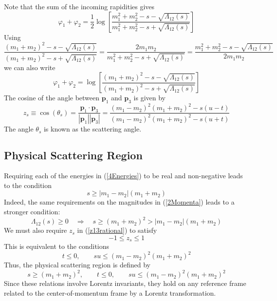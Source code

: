 Note that the sum of the incoming rapidities gives
\begin{equation}
	\varphi_{1} + \varphi_{2} = \frac{1}{2} \log{\left[ \frac{m_{1}^{2} + m_{2}^{2} - s - \sqrt{\Lambda_{12}(s)}}{m_{1}^{2} + m_{2}^{2} - s + \sqrt{\Lambda_{12}(s)}} \right]}
\end{equation}
Using
\begin{equation}
	\frac{(m_{1} + m_{2})^{2} - s - \sqrt{\Lambda_{12}(s)}}{(m_{1} + m_{2})^{2} - s + \sqrt{\Lambda_{12}(s)}} = \frac{2m_{1}m_{2}}{m_{1}^{2} + m_{2}^{2} - s + \sqrt{\Lambda_{12}(s)}} = \frac{m_{1}^{2} + m_{2}^{2} - s - \sqrt{\Lambda_{12}(s)}}{2m_{1}m_{2}}
\end{equation}
we can also write
\begin{equation}
	\varphi_{1} + \varphi_{2} = \log{\left[ \frac{(m_{1} + m_{2})^{2} - s - \sqrt{\Lambda_{12}(s)}}{(m_{1} + m_{2})^{2} - s + \sqrt{\Lambda_{12}(s)}} \right]} \label{rap12}
\end{equation}
The cosine of the angle between $\mathbf{p}_{1}$ and $\mathbf{p}_{3}$ is given by
\begin{equation}
	z_{s} \equiv \cos(\theta_{s}) = \frac{\mathbf{p}_{1} \cdot \mathbf{p}_{3}}{|\mathbf{p}_{1}| |\mathbf{p}_{3}|} = \frac{(m_{1} - m_{2})^{2} (m_{1} + m_{2})^{2} - s (u - t)}{(m_{1} - m_{2})^{2} (m_{1} + m_{2})^{2} - s (u + t)} \label{z13rational}
\end{equation}
The angle $\theta_{s}$ is known as the scattering angle.
\subsection{Physical Scattering Region}
Requiring each of the energies in (\ref{4Energies}) to be real and non-negative leads to the condition
\begin{equation}
	s \geq |m_{1} - m_{2}| (m_{1} + m_{2})
\end{equation}
Indeed, the same requirements on the magnitudes in (\ref{2Momenta}) leads to a stronger condition:
\begin{equation}
	\Lambda_{12}(s) \geq 0 \quad \Longrightarrow \quad s \geq (m_{1} + m_{2})^{2} > |m_{1} - m_{2}| (m_{1} + m_{2})
\end{equation}
We must also require $z_{s}$ in (\ref{z13rational}) to satisfy
\begin{equation}
	{-1} \leq z_{s} \leq 1
\end{equation}
This is equivalent to the conditions
\begin{equation}
	t \leq 0, \qquad s u \leq (m_{1} - m_{2})^{2} (m_{1} + m_{2})^{2}
\end{equation}
Thus, the physical scattering region is defined by
\begin{equation}
	s \geq (m_{1} + m_{2})^{2}, \qquad t \leq 0, \qquad s u \leq (m_{1} - m_{2})^{2} (m_{1} + m_{2})^{2}
\end{equation}
Since these relations involve Lorentz invariants, they hold on any reference frame related to the center-of-momentum frame by a Lorentz transformation.